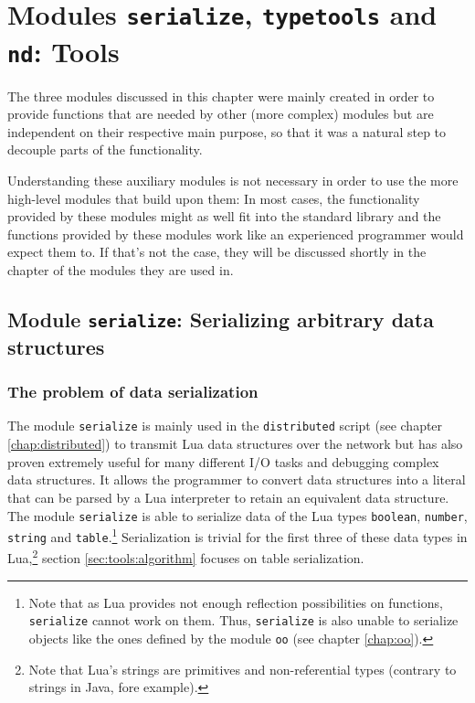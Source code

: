 \chapter{Modules \texttt{serialize}, \texttt{typetools} and \texttt{nd}: Tools}
\label{chap:serialize}
\label{chap:typetools}
\label{chap:nd}

The three modules discussed in this chapter were mainly created in order to provide functions that are needed by other (more complex) modules but are independent on their respective main purpose, so that it was a natural step to decouple parts of the functionality.

Understanding these auxiliary modules is not necessary in order to use the more high-level modules that build upon them: In most cases, the functionality provided by these modules might as well fit into the standard library and the functions provided by these modules work like an experienced programmer would expect them to. If that's not the case, they will be discussed shortly in the chapter of the modules they are used in.

\section{Module \texttt{serialize}: Serializing arbitrary data structures}
\label{sec:tools:serialize}

\subsection{The problem of data serialization}
\label{sec:tools:serialize:problem}

The module \texttt{serialize} is mainly used in the \texttt{distributed} script (see chapter \ref{chap:distributed}) to transmit Lua data structures over the network but has also proven extremely useful for many different I/O tasks and debugging complex data structures. It allows the programmer to convert data structures into a literal that can be parsed by a Lua interpreter to retain an equivalent data structure. The module \texttt{serialize} is able to serialize data of the Lua types \texttt{boolean}, \texttt{number}, \texttt{string} and \texttt{table}.\footnote{Note that as Lua provides not enough reflection possibilities on functions, \texttt{serialize} cannot work on them. Thus, \texttt{serialize} is also unable to serialize objects like the ones defined by the module \texttt{oo} (see chapter \ref{chap:oo}).} Serialization is trivial for the first three of these data types in Lua,\footnote{Note that Lua's strings are primitives and non-referential types (contrary to strings in Java, fore example).} section \ref{sec:tools:algorithm} focuses on table serialization.

